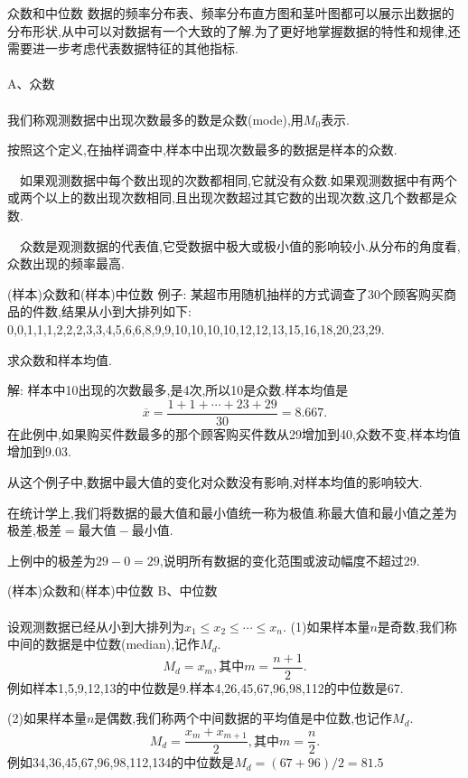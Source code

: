 	\begin{frame}{众数和中位数}
		数据的频率分布表、频率分布直方图和茎叶图都可以展示出数据的分布形状,从中可以对数据有一个大致的了解.为了更好地掌握数据的特性和规律,还需要进一步考虑代表数据特征的其他指标.
		\\ \hspace*{\fill} \\
		\alert{A、众数}
		\\ \hspace*{\fill} \\
		我们称观测数据中出现次数最多的数是\alert{众数}(mode),用$M_0$表示.
		
		按照这个定义,在抽样调查中,样本中出现次数最多的数据是样本的众数.
		
		$\quad$如果观测数据中每个数出现的次数都相同,它就没有众数.如果观测数据中有两个或两个以上的数出现次数相同,且出现次数超过其它数的出现次数,这几个数都是众数.
		
		$\quad$众数是观测数据的代表值,它受数据中极大或极小值的影响较小.从分布的角度看,众数出现的频率最高.			
	\end{frame}

	\begin{frame}{(样本)众数和(样本)中位数}
		例子: 某超市用随机抽样的方式调查了30个顾客购买商品的件数,结果从小到大排列如下:
		0,0,1,1,1,2,2,2,3,3,4,5,6,6,8,9,9,10,10,10,10,12,12,13,15,16,18,20,23,29.
		
		求众数和样本均值.
		
		解: 样本中10出现的次数最多,是4次,所以10是众数.样本均值是
		\begin{equation}
			\overline{x} = \frac{1+1+\cdots+23+29}{30} = 8.667.
		\end{equation}
		在此例中,如果购买件数最多的那个顾客购买件数从29增加到40,众数不变,样本均值增加到9.03.
		
		从这个例子中,数据中最大值的变化对众数没有影响,对样本均值的影响较大.
		
		在统计学上,我们将数据的最大值和最小值统一称为极值.称最大值和最小值之差为\alert{极差},$\text{极差} = \text{最大值} - \text{最小值}.$
		
		上例中的极差为$29-0 = 29$,说明所有数据的变化范围或波动幅度不超过29.
	\end{frame}

	\begin{frame}{(样本)众数和(样本)中位数}
		\alert{B、中位数}
		\\ \hspace*{\fill} \\
		设观测数据已经从小到大排列为$x_1\leqslant x_2\leqslant\cdots\leqslant x_n$.
		(1)如果样本量$n$是奇数,我们称中间的数据是\alert{中位数}(median),记作$M_d$.
		\begin{equation}
			M_d = x_m,\text{其中}m = \frac{n+1}{2}.
		\end{equation}
		例如样本1,5,9,12,13的中位数是9.样本4,26,45,67,96,98,112的中位数是67.
		
		(2)如果样本量$n$是偶数,我们称两个中间数据的平均值是中位数,也记作$M_d$.
		\begin{equation}
			M_d = \frac{x_m+x_{m+1}}{2},\text{其中}m = \frac{n}{2}.
		\end{equation}
		例如34,36,45,67,96,98,112,134的中位数是$M_d = (67+96)/2 = 81.5$
	\end{frame}

